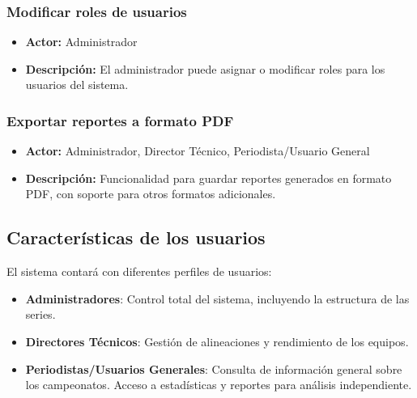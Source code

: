 \documentclass{report}
\begin{document}
\begin{enumerate}
            \subsubsection{Modificar roles de usuarios}
            \begin{itemize}
                \item \textbf{Actor:} Administrador
                \item \textbf{Descripción:} El administrador puede asignar o modificar roles para los usuarios del 
                sistema.
            \end{itemize}

            \subsubsection{Exportar reportes a formato PDF}
            \begin{itemize}
                \item \textbf{Actor:} Administrador, Director Técnico, Periodista/Usuario General
                \item \textbf{Descripción:} Funcionalidad para guardar reportes generados en formato PDF, con 
                soporte para otros formatos adicionales.
            \end{itemize}

        \end{enumerate}


        \subsection*{Características de los usuarios}
        El sistema contará con diferentes perfiles de usuarios:
        \begin{itemize}
            \item \textbf{Administradores}: Control total del sistema, incluyendo la estructura de las series.
            \item \textbf{Directores Técnicos}: Gestión de alineaciones y rendimiento de los equipos.
            \item \textbf{Periodistas/Usuarios Generales}: Consulta de información general sobre los campeonatos. 
            Acceso a estadísticas y reportes para análisis independiente.
        \end{itemize}
\end{document}
